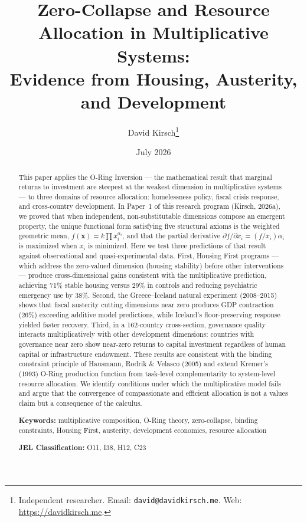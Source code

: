 \documentclass[12pt]{article}
\title{Zero-Collapse and Resource Allocation in Multiplicative Systems: \\
Evidence from Housing, Austerity, and Development}
\author{David Kirsch\thanks{Independent researcher. Email: \texttt{david@davidkirsch.me}. Web: \url{https://davidkirsch.me}.}}
\date{July 2026}
\begin{document}
\maketitle

\begin{abstract}
\noindent This paper applies the O-Ring Inversion --- the mathematical result that marginal returns to investment are steepest at the weakest dimension in multiplicative systems --- to three domains of resource allocation: homelessness policy, fiscal crisis response, and cross-country development. In Paper~1 of this research program (Kirsch, 2026a), we proved that when independent, non-substitutable dimensions compose an emergent property, the unique functional form satisfying five structural axioms is the weighted geometric mean, $f(\mathbf{x}) = k\prod x_i^{\alpha_i}$, and that the partial derivative $\partial f/\partial x_i = (f/x_i)\alpha_i$ is maximized when $x_i$ is minimized. Here we test three predictions of that result against observational and quasi-experimental data. First, Housing First programs --- which address the zero-valued dimension (housing stability) before other interventions --- produce cross-dimensional gains consistent with the multiplicative prediction, achieving 71\% stable housing versus 29\% in controls and reducing psychiatric emergency use by 38\%. Second, the Greece--Iceland natural experiment (2008--2015) shows that fiscal austerity cutting dimensions near zero produces GDP contraction (26\%) exceeding additive model predictions, while Iceland's floor-preserving response yielded faster recovery. Third, in a 162-country cross-section, governance quality interacts multiplicatively with other development dimensions: countries with governance near zero show near-zero returns to capital investment regardless of human capital or infrastructure endowment. These results are consistent with the binding constraint principle of Hausmann, Rodrik \& Velasco (2005) and extend Kremer's (1993) O-Ring production function from task-level complementarity to system-level resource allocation. We identify conditions under which the multiplicative model fails and argue that the convergence of compassionate and efficient allocation is not a values claim but a consequence of the calculus.

\medskip
\noindent \textbf{Keywords:} multiplicative composition, O-Ring theory, zero-collapse, binding constraints, Housing First, austerity, development economics, resource allocation

\medskip
\noindent \textbf{JEL Classification:} O11, I38, H12, C23
\end{abstract}
\end{document}
